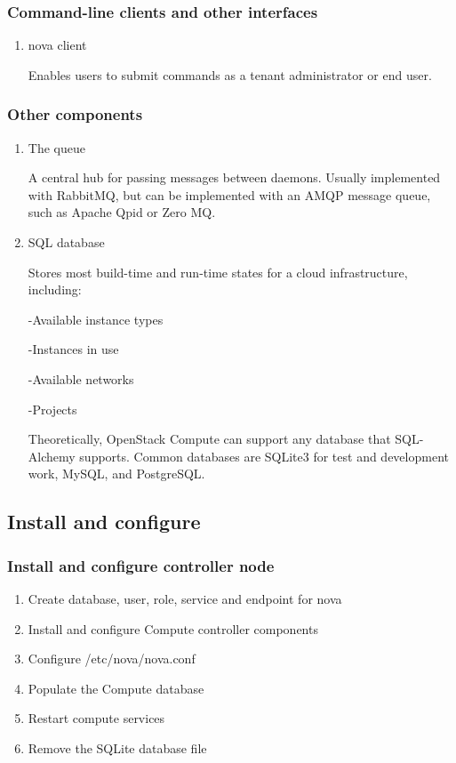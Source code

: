     \subsubsection{Command-line clients and other interfaces}
        \begin{enumerate}
            \item nova client
            \par Enables users to submit commands as a tenant administrator or end user.
        \end{enumerate}
    \subsubsection{Other components}
        \begin{enumerate}
            \item The queue
            \par A central hub for passing messages between daemons. Usually implemented with RabbitMQ, but can be implemented with an AMQP message queue, such as Apache Qpid or Zero MQ.

            \item SQL database
            \par Stores most build-time and run-time states for a cloud infrastructure, including:
            \par -Available instance types
            \par -Instances in use
            \par -Available networks
            \par -Projects

            \par Theoretically, OpenStack Compute can support any database that SQL-Alchemy supports. Common databases are SQLite3 for test and development work, MySQL, and PostgreSQL.
        \end{enumerate}
    \subsection{Install and configure}
    
    \subsubsection{Install and configure controller node}
        \begin{enumerate}
            \item Create database, user, role, service and endpoint for nova
            \item Install and configure Compute controller components
            \item Configure /etc/nova/nova.conf
            \item Populate the Compute database
            \item Restart compute services
            \item Remove the SQLite database file
        \end{enumerate}        
    
